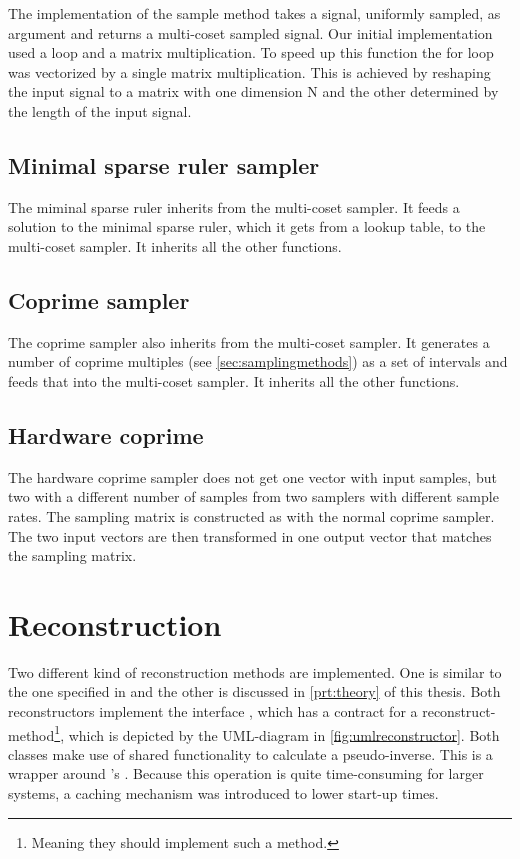 \documentclass[a4paper, openany, oneside]{memoir}
\begin{document}
The implementation of the sample method takes a signal, uniformly sampled, as argument and returns a multi-coset sampled signal. Our initial implementation used a loop and a matrix multiplication. To speed up this function the for loop was vectorized by a single matrix multiplication. This is achieved by reshaping the input signal to a matrix with one dimension N and the other determined by the length of the input signal.

\subsection{Minimal sparse ruler sampler}
\label{sec:multi-coset-sampler}
The miminal sparse ruler inherits from the multi-coset sampler. It feeds a solution to the minimal sparse ruler, which it gets from a lookup table, to the multi-coset sampler. It inherits all the other functions.

\subsection{Coprime sampler}
\label{sec:coprime-sampler}
The coprime sampler also inherits from the multi-coset sampler. It generates a number of coprime multiples (see \cref{sec:samplingmethods}) as a set of intervals and feeds that into the multi-coset sampler. It inherits all the other functions.

\subsection{Hardware coprime}
\label{sec:hardware-coprime}
The hardware coprime sampler does not get one vector with input samples, but two with a different number of samples from two samplers with different sample rates. The sampling matrix is constructed as with the normal coprime sampler. The two input vectors are then transformed in one output vector that matches the sampling matrix.

\section{Reconstruction}
\label{sec:reconstruction}
Two different kind of reconstruction methods are implemented. One is similar to the one specified in \cite{ariananda2012compressive} and the other is discussed in \cref{prt:theory} of this thesis. Both reconstructors implement the interface , which has a contract for a reconstruct-method\footnote{Meaning they should implement such a method.}, which is depicted by the UML-diagram in \cref{fig:umlreconstructor}.
Both classes make use of shared functionality to calculate a pseudo-inverse. This is a wrapper around 's . Because this operation is quite time-consuming for larger systems, a caching mechanism was introduced to lower start-up times.%
\end{document}
